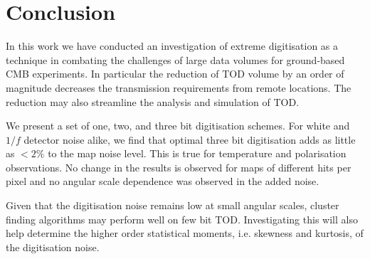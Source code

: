\documentclass[apj]{emulateapj}
\begin{document}

\section{Conclusion}
\label{sec:conclusions}

In this work we have conducted an investigation of extreme digitisation as a technique in combating the challenges of large data volumes for ground-based CMB experiments. In particular the reduction of TOD volume by an order of magnitude decreases the transmission requirements from remote locations. The reduction may also streamline the analysis and simulation of TOD.

We present a set of one, two, and three bit digitisation schemes. For white and $1/f$ detector noise alike, we find that optimal three bit digitisation adds as little as $<2\%$ to the map noise level. This is true for temperature and polarisation observations. No change in the results is observed for maps of different hits per pixel and no angular scale dependence was observed in the added noise.


Given that the digitisation noise remains low at small angular scales, cluster finding algorithms may perform well on few bit TOD. Investigating this will also help determine the higher order statistical moments, i.e. skewness and kurtosis, of the digitisation noise.

\acknowledgments %

\end{document}
